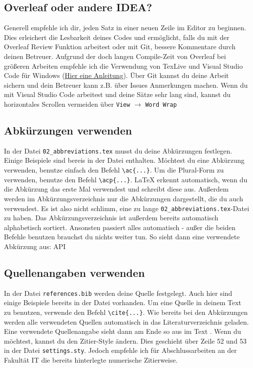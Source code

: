 \subsection{Overleaf oder andere IDEA?}
Generell empfehle ich dir, jeden Satz in einer neuen Zeile im Editor zu beginnen.
Dies erleichert die Lesbarkeit deines Codes und ermöglicht, falls du mit der Overleaf Review Funktion arbeitest oder mit Git, bessere Kommentare durch deinen Betreuer.
Aufgrund der doch langen Compile-Zeit von Overleaf bei größeren Arbeiten empfehle ich die Verwendung von TexLive und Visual Studio Code für Windows (\href{https://blog.jakelee.co.uk/getting-latex-working-in-vscode-on-windows/}{Hier eine Anleitung}).
Über Git kannst du deine Arbeit sichern und dein Betreuer kann z.B. über Issues Anmerkungen machen.
Wenn du mit Visual Studio Code arbeitest und deine Sätze sehr lang sind, kannst du horizontales Scrollen vermeiden über \verb|View| $\rightarrow$ \verb|Word Wrap|



\subsection{Abkürzungen verwenden}
In der Datei \verb|02_abbreviations.tex| musst du deine Abkürzungen festlegen.
Einige Beispiele sind bereis in der Datei enthalten.
Möchtest du eine Abkürzung verwenden, benutze einfach den Befehl \verb|\ac{...}|.
Um die Plural-Form zu verwenden, benutze den Befehl \verb|\acp{...}|.
LaTeX erkennt automatisch, wenn du die Abkürzung das erste Mal verwendest und schreibt diese aus.
Außerdem werden im Abkürzungsverzeichnis nur die Abkürzungen dargestellt, die du auch verwendest.
Es ist also nicht schlimm, eine zu lange \verb|02_abbreviations.tex|-Datei zu haben.
Das Abkürzungsverzeichnis ist außerdem bereits automatisch alphabetisch sortiert.
Ansonsten passiert alles automatisch - außer die beiden Befehle benutzen brauchst du nichts weiter tun.
So sieht dann eine verwendete Abkürzung aus: \ac{API}



\subsection{Quellenangaben verwenden}
In der Datei \verb|references.bib| werden deine Quelle festgelegt.
Auch hier sind einige Beispiele bereits in der Datei vorhanden.
Um eine Quelle in deinem Text zu benutzen, verwende den Befehl \verb|\cite{...}|.
Wie bereits bei den Abkürzungen werden alle verwendeten Quellen automatisch in das Literaturverzeichnis geladen.
Eine verwendete Quellenangabe sieht dann am Ende so aus im Text \cite{test}.
Wenn du möchtest, kannst du den Zitier-Style ändern.
Dies geschieht über Zeile 52 und 53 in der Datei \verb|settings.sty|.
Jedoch empfehle ich für Abschlussarbeiten an der Fakultät IT die bereits hinterlegte numerische Zitierweise.

